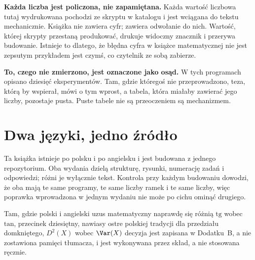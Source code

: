 \begin{note}
\textbf{Każda liczba jest policzona, nie zapamiętana.} Każda wartość liczbowa
tutaj wydrukowana pochodzi ze skryptu w katalogu  i jest wciągana
do tekstu mechanicznie. Książka nie zawiera cyfr; zawiera odwołanie do nich.
Wartość, której skrypty przestaną produkować, drukuje widoczny znacznik i
przerywa budowanie. Istnieje to dlatego, że błędna cyfra w książce
matematycznej nie jest zepsutym przykładem \dash{} jest czymś, co czytelnik ze
sobą zabierze.
\end{note}

\begin{note}
\textbf{To, czego nie zmierzono, jest oznaczone jako osąd.} W tych programach
opisano dziesięć eksperymentów. Tam, gdzie któregoś nie przeprowadzono, teza,
którą by wspierał, mówi o tym wprost, a tabela, która miałaby zawierać jego
liczby, pozostaje pusta. Puste tabele nie są przeoczeniem \dash{} są mechanizmem.
\end{note}

\section*{Dwa języki, jedno źródło}

Ta książka istnieje po polsku i po angielsku i jest budowana z jednego
repozytorium. Oba wydania dzielą strukturę, rysunki, numerację zadań i
odpowiedzi; różni je wyłącznie tekst. Kontrola przy każdym budowaniu dowodzi,
że oba mają te same programy, te same liczby ramek i te same liczby, więc
poprawka wprowadzona w jednym wydaniu nie może po cichu ominąć drugiego.

Tam, gdzie polski i angielski uzus matematyczny naprawdę się różnią \dash{}
$\mathrm{tg}$ wobec $\mathrm{tan}$, przecinek dziesiętny, nawiasy ostre polskiej tradycji dla
przedziału domkniętego, $D^2(X)$ wobec $\Var(X)$ \dash{} decyzja jest zapisana w
Dodatku~B, a nie zostawiona pamięci tłumacza, i jest wykonywana przez skład, a
nie stosowana ręcznie.
